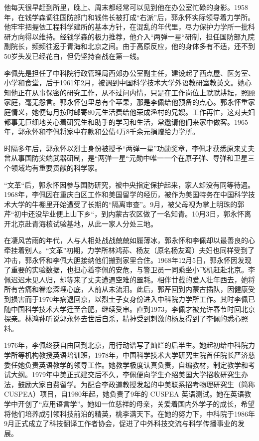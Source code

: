 他每天很早赶到所里，晚上、周末都经常可以见到他在办公室忙碌的身影。1958年，在钱学森调往国防部门和钱伟长被打成“右派”后，郭永怀实际领导着力学所。他牢牢把握依工程科学建所的基本方针，在混乱的年代里，尽力保护力学所一批科研方向得以维持。经钱学森的极力推荐，他介入“两弹一星“研制，担任国防部九院副院长，频频往返于青海和北京之间。由于高原反应，他的身体多有不适，还不到50岁头发已经花白，但仍坚持奋战在第一线。

李佩先是担任了中科院行政管理局西郊办公室副主任，建设起了西点屋、医务室、小学和食堂，后于1961年2月，被调到中国科学技术大学外语教研室教英文。她心知他正在从事保密的研究工作，从不过问内情，只是在工作岗位上默默耕耘，照顾家庭，毫无怨言。郭永怀包里总有个苹果，那是李佩给他预备的点心。郭永怀重家庭情义，她便每月按时邮寄80元生活费给他荣成渔村的兄嫂。工作再忙，这对夫妇都事无巨细地关心着研究生和助手的学习和生活，常邀请他们来家中做客。1965年，郭永怀和李佩将家中存款和公债4万8千余元捐赠给力学所。

时隔多年后，郭永怀以烈士身份被授予“两弹一星”功勋奖章，李佩才获悉原来丈夫曾从事国防尖端武器研制，是“两弹一星“元勋中唯一一个在原子弹、导弹和卫星三个领域均有重要贡献的科学家。

“文革“后，郭永怀因参与国防研究，被中央指定保护起来，家人却没有同等待遇。1968年，李佩因在重庆白区工作和美国留学的经历，被作为美国特务在中国科学技术大学的牛棚里开始遭受了长期的“隔离审查”。9月，被父母视为掌上明珠的郭芹“初中还没毕业便上山下乡“，到内蒙古农区做了一名知青。10月3日，郭永怀离开北京赴青海核试验基地，从此一家人分处三地。

在凄风苦雨的年代，人与人相处战战兢兢如履薄冰，郭永怀和李佩却以最善良的心牵挂着别人。“文革”初期，力学所林鸿荪、杨友（原名杨友鸾）夫妇也同样受到了冲击，郭永怀和李佩大胆接纳他们搬到家里合住。1968年12月5日，郭永怀因发现了重要的实验数据，也担心着李佩的安危，与警卫员一同乘坐小飞机赶赴北京。李佩迟迟未见人归，却等来了丈夫遭遇空难的噩耗。相伴廿载的爱人壮年西去，她将所有苦痛和眷恋深埋心底，人前从未流泪。此后，郭芹回到内蒙古插队，因健康受到损害而于1970年病退回京，以烈士子女身份进入中科院力学所工作。其时李佩已随中国科学技术大学迁至合肥，继续受审。直到1973，李佩才被允许春节时回北京探亲。林鸿荪听说郭永怀去世后自杀，精神受到刺激的杨友得到了李佩的悉心照料。

1976年，李佩终获自由回到北京，用行动谱写了灿烂的后半生。她起初给中科院力学所等机构教授英语培训班，1978年，中国科学技术大学研究生院首任院长严济慈委任她负责英语教学的领导工作。她教学极度认真负责，自编教材，制定教学和考试大纲。1979年中美正式建交后不久，李佩便向学生介绍美国大学招收研究生办法，鼓励大家自费留学。为配合李政道教授发起的中美联系招考物理研究生（简称CUSPEA）项目，自1980年起，她负责了9年的 CUSPEA 英语测试。她在英语教学中开创了“应用语言学”。她如一位慈祥的母亲，关爱着国内外学子的成长，希望将他们培养成引领科技前沿的精英，桃李满天下。在她的努力下，中科院于1986年9月正式成立了科技翻译工作者协会，促进了中外科技交流与科学传播事业的发展。

